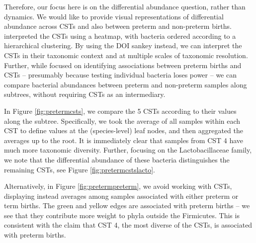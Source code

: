 Therefore, our focus here is on the differential abundance question,
rather than dynamics. We would like to provide visual representations of
differential abundance across CSTs and also between preterm and non-preterm
births. \citet{digiulio2015temporal} interpreted the CSTs using a heatmap, with
bacteria ordered according to a hierarchical clustering. By using the DOI sankey
instead, we can interpret the CSTs in their taxonomic context and at multiple
scales of taxonomic resolution. Further, while
\citet{digiulio2015temporal} focused on identifying associations between
preterm births and CSTs -- presumably because testing individual bacteria loses
power -- we can compare bacterial abundances between preterm and non-preterm
samples along subtrees, without requiring CSTs as an intermediary.

In Figure \ref{fig:pretermcsts}, we compare the 5 CSTs according to
their values along the subtree. Specifically, we took the average of all
samples within each CST to define values at the (species-level) leaf
nodes, and then aggregated the averages up to the root. It is
immediately clear that samples from CST 4 have much more taxonomic
diversity. Further, focusing on the Lactobacillaceae family, we note
that the differential abundance of these bacteria distinguishes the
remaining CSTs, see Figure \ref{fig:pretermcstslacto}.

Alternatively, in Figure \ref{fig:pretermpreterm}, we avoid working with CSTs,
displaying instead averages among samples associated with either preterm or term
births. The green and yellow edges are associated with preterm births -- we see
that they contribute more weight to phyla outside the Firmicutes. This is
consistent with the claim that CST 4, the most diverse of the CSTs, is
associated with preterm births.


